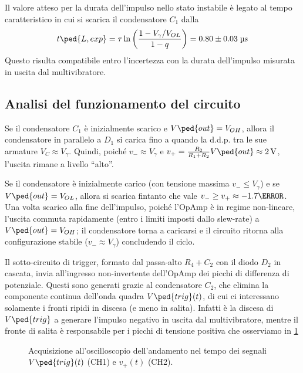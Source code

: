 \documentclass[10pt, a4paper, italian]{article}
\begin{document}
Il valore atteso per la durata dell'impulso nello stato instabile è legato
al tempo caratteristico in cui si scarica il condensatore $C_1$ dalla
\begin{equation}\label{eq: mstable_Delta}
t\ped{L, exp} = \tau \ln{\left(\frac{1 - V_\gamma/V_{OL}}{1 - q}\right)} =
0.80 \pm 0.03 \; \si{\micro\s}
\end{equation}
Questo risulta compatibile entro l'incertezza con la durata dell'impulso
misurata in uscita dal multivibratore.

\subsection{Analisi del funzionamento del circuito}
Se il condensatore $C_1$ è inizialmente scarico e $V\ped{out} = V_{OH}$, allora
il condensatore in parallelo a $D_1$ si carica fino a quando la d.d.p. tra le
sue armature $V_C \approx V_{\gamma}$. Quindi, poiché $v_- \approx V_{\gamma}$
e $v_+ = \frac{R_{2}}{R_{1} + R_{2}} V\ped{out} \approx \SI{2}{V}$, l'uscita
rimane a livello ``alto''.

Se il condensatore è inizialmente carico (con tensione massima
$v_- \leq V_\gamma$) e se $V\ped{out} = V_{OL}$, allora si scarica fintanto
che vale $v_- \geq v_+ \approx - 1.7 {\V}$. Una volta scarico alla fine
dell'impulso, poiché l'OpAmp è in regime non-lineare, l'uscita commuta
rapidamente (entro i limiti imposti dallo slew-rate) a $V\ped{out} = V_{OH}$;
il condensatore torna a caricarsi e il circuito ritorna alla configurazione
stabile ($v_- \approx V_\gamma$) concludendo il ciclo.

Il sotto-circuito di trigger, formato dal passa-alto $R_4 + C_2$ con il diodo
$D_2$ in cascata, invia all'ingresso non-invertente dell'OpAmp dei picchi di
differenza di potenziale. Questi sono generati grazie al condensatore $C_2$, 
che elimina la componente continua dell'onda quadra $V\ped{trig} (t)$, di cui
ci interessano solamente i fronti ripidi in discesa (e meno in salita).
Infatti è la discesa di $V\ped{trig}$ a generare l'impulso negativo in uscita
dal multivibratore, mentre il fronte di salita è responsabile per i picchi di
tensione positiva che osserviamo in \cref{fig: mstabilev+vtrig}
\begin{figure}[htbp]
	\centering
	\caption{Acquisizione all'oscilloscopio dell'andamento nel tempo dei
	segnali $V\ped{trig} (t)$ (CH1) e $v_+ (t)$ (CH2).
	\label{fig: mstabilev+vtrig}}
\end{figure}
\end{document}
